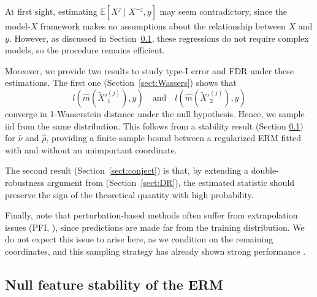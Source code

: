 \documentclass{article}
\theoremstyle{plain}
\theoremstyle{definition}
\theoremstyle{remark}
\begin{document}
At first sight, estimating $\mathbb{E}[X^j \mid X^{-j}, y]$ may seem contradictory, since the model-$X$ framework makes no assumptions about the relationship between $X$ and $y$. 
%
However, as discussed in Section~\ref{sect:stab}, these regressions do not require complex models, so the procedure remains efficient. %

Moreover, we provide two results to study type-I error and FDR under these estimations. The first one (Section~\ref{sect:Wassers}) shows that 
\[
l(\widehat{m}(\widetilde{X}'^{(j)}_1), y)
\quad\text{and}\quad
l(\widehat{m}(\widetilde{X}'^{(j)}_2), y)
\]
converge in 1-Wasserstein distance under the null hypothesis. Hence, we sample iid from the same distribution. This follows from a stability result (Section \ref{sect:stab}) for $\widehat{\nu}$ and $\widehat{\rho}$, providing a finite-sample bound between a regularized ERM fitted with and without an unimportant coordinate.


The second result (Section~\ref{sect:conject}) is that, by extending a double-robustness argument from \citet{reyerolobo2025conditionalfeatureimportancerevisited} (Section~\ref{sect:DR}), the estimated statistic should preserve the sign of the theoretical quantity with high probability. 

Finally, note that perturbation-based methods often suffer from extrapolation issues (PFI, \citet{Hooker2019PleaseSP}), since predictions are made far from the training distribution. We do not expect this issue to arise here, as we condition on the remaining coordinates, and this sampling strategy has already shown strong performance \citep{chamma2024statistically}.





 \subsection{Null feature stability of the ERM}\label{sect:stab}
 
\end{document}
